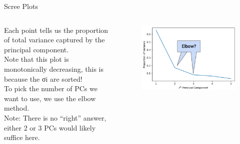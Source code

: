 \documentclass[aspectratio=169]{../latex_main/tntbeamer}  %
\begin{document}
	
	\begin{frame}{Scree Plots}
	 \begin{columns}
	     \begin{column}{.5\textwidth}
	         Each point tells us the proportion of total variance captured by the principal component.\\
	         Note that this plot is monotonically decreasing, this is because the σi are sorted!\\
	         To pick the number of PCs we want to use, we use the elbow method.\\
	         Note: There is no “right” answer, either 2 or 3 PCs would likely suffice here.
	     \end{column}
	     
	     
	     
	     \begin{column}{.5\textwidth}
	         \begin{figure}
	             \centering
	             \includegraphics[scale=.45]{Bild14}
	         \end{figure}
	     \end{column}
	 \end{columns}
	    
	\end{frame}
	
\end{document}
